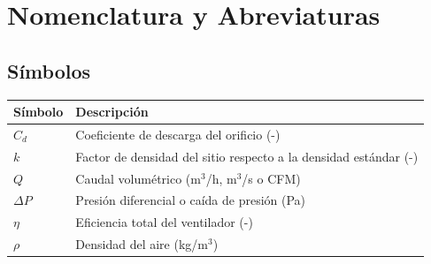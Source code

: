 \section*{Nomenclatura y Abreviaturas}

\subsection*{Símbolos}
\begin{tabularx}{\textwidth}{@{}lX@{}}
	\toprule
	\textbf{Símbolo} & \textbf{Descripción} \\
	\midrule
	$C_d$ & Coeficiente de descarga del orificio (-) \\
	$k$ & Factor de densidad del sitio respecto a la densidad estándar (-) \\
	$Q$ & Caudal volumétrico (m$^3$/h, m$^3$/s o CFM) \\
	$\Delta P$ & Presión diferencial o caída de presión (Pa) \\
	$\eta$ & Eficiencia total del ventilador (-) \\
	$\rho$ & Densidad del aire (kg/m$^3$) \\
	\bottomrule
\end{tabularx}

\vspace{1cm}

